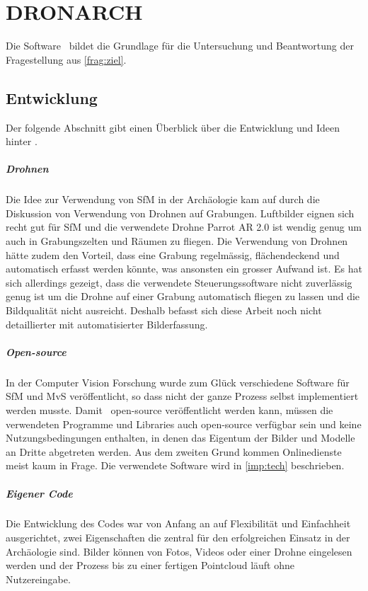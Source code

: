 \chapter{DRONARCH}
	Die Software \dronarch\ bildet die Grundlage für die Untersuchung und Beantwortung der Fragestellung aus \autoref{frag:ziel}.
	\section{Entwicklung}
		Der folgende Abschnitt gibt einen Überblick über die Entwicklung und Ideen hinter \dronarch. %
		
		\paragraph{Drohnen}
		Die Idee zur Verwendung von SfM in der Archäologie kam auf durch die Diskussion von Verwendung von Drohnen auf Grabungen. Luftbilder eignen sich recht gut für SfM \cite{ARP:ARP399, ARCM:ARCM667} und die verwendete Drohne Parrot AR 2.0 ist wendig genug um auch in Grabungszelten und Räumen zu fliegen. Die Verwendung von Drohnen hätte zudem den Vorteil, dass eine Grabung regelmässig, flächendeckend und automatisch erfasst werden könnte, was ansonsten ein grosser Aufwand ist.
		Es hat sich allerdings gezeigt, dass die verwendete Steuerungssoftware nicht zuverlässig genug ist um die Drohne auf einer Grabung automatisch fliegen zu lassen und die Bildqualität nicht ausreicht.
		Deshalb befasst sich diese Arbeit noch nicht detaillierter mit automatisierter Bilderfassung.
		
		\paragraph{Open-source}
		In der Computer Vision Forschung wurde zum Glück verschiedene Software für SfM und MvS veröffentlicht, so dass nicht der ganze Prozess selbst implementiert werden musste.
		Damit \dronarch\ open-source veröffentlicht werden kann, müssen die verwendeten Programme und Libraries auch open-source verfügbar sein und keine Nutzungsbedingungen enthalten, in denen das Eigentum der Bilder und Modelle an Dritte abgetreten werden. Aus dem zweiten Grund kommen Onlinedienste meist kaum in Frage.
		Die verwendete Software wird in \autoref{imp:tech} beschrieben.
		
		\paragraph{Eigener Code}
		Die Entwicklung des Codes war von Anfang an auf Flexibilität und Einfachheit ausgerichtet, zwei Eigenschaften die zentral für den erfolgreichen Einsatz in der Archäologie sind.
		Bilder können von Fotos, Videos oder einer Drohne eingelesen werden und der Prozess bis zu einer fertigen Pointcloud läuft ohne Nutzereingabe.
		

